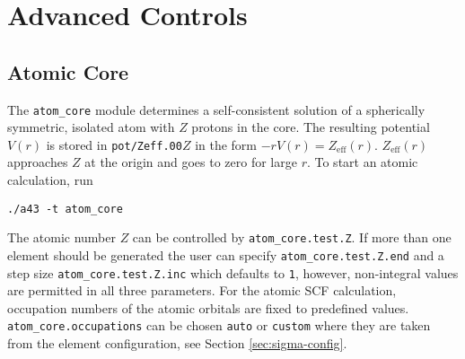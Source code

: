 \documentclass[oribibl]{llncs}
\newcommand{\um}[1]{_{\mathrm{#1}}}
\newcommand{\ttt}[1]{\texttt{#1}}
\begin{document}
\section{Advanced Controls} \label{sec:advanced-controls}


\subsection{Atomic Core} \label{sec:atom-core}
%
The \ttt{atom\_core} module determines a self-consistent solution
of a spherically symmetric, isolated atom with $Z$ protons in the core.
The resulting potential $V(r)$ is stored in \ttt{pot/Zeff.00}$Z$
in the form $-rV(r) = Z\um{eff}(r)$.
$Z\um{eff}(r)$ approaches $Z$ at the origin and goes to zero for large $r$.
To start an atomic calculation, run
\begin{verbatim}
./a43 -t atom_core
\end{verbatim}
The atomic number $Z$ can be controlled by \ttt{atom\_core.test.Z}.
If more than one element should be generated
the user can specify \ttt{atom\_core.test.Z.end} 
and a step size \ttt{atom\_core.test.Z.inc} which defaults to \ttt{1}, however,
non-integral values are permitted in all three parameters.
%
\noindent
For the atomic \ac{SCF} calculation, occupation numbers of the atomic orbitals are fixed
to predefined values. \ttt{atom\_core.occupations} can be chosen \ttt{auto}
or \ttt{custom} where they are taken from the element configuration, see Section \ref{sec:sigma-config}.
\end{document}

